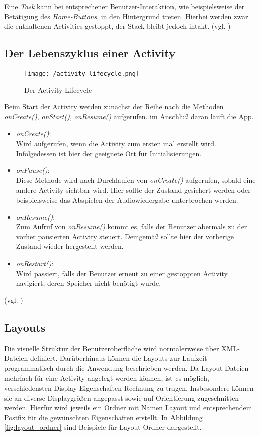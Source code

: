 Eine \emph{Task} kann bei entsprechener Benutzer-Interaktion, wie
beispielsweise der Betätigung des \emph{Home-Buttons}, in den Hintergrund treten.
Hierbei werden zwar die enthaltenen Activities gestoppt, der Stack bleibt jedoch intakt.
(vgl. \cite{ADevBackstack})
\subsection{Der Lebenszyklus einer Activity}

\begin{figure}[H]
\centering
\texttt{[image: /activity\_lifecycle.png]}
\caption{Der Activity Lifecycle \cite{ADevActivity}}
\label{fig:actlifecycle}
\end{figure}

Beim Start der Activity werden zunächst der Reihe nach die Methoden \emph{onCreate()},
\emph{onStart()}, \emph{onResume()} aufgerufen. im Anschluß daran läuft die App.

\begin{itemize}
   \item \emph{onCreate()}:\\
   Wird aufgerufen, wenn die Activity zum ersten mal erstellt wird. Infolgedessen ist hier
   der geeignete Ort für Initialisierungen.
   \item \emph{onPause()}:\\
   Diese Methode wird nach Durchlaufen von \emph{onCreate()} aufgerufen, sobald eine andere Activity
   sichtbar wird. Hier sollte der Zustand gesichert werden oder beispielsweise das Abspielen der
   Audiowiedergabe unterbrochen werden.
   \item \emph{onResume()}:\\
   Zum Aufruf von \emph{onResume()} kommt es, falls der Benutzer abermals zu der vorher pausierten
   Activity steuert. Demgemäß sollte hier der vorherige Zustand wieder hergestellt werden.
   \item \emph{onRestart()}:\\
   Wird passiert, falls der Benutzer erneut zu einer gestoppten Activity navigiert, deren
   Speicher nicht benötigt wurde.
\end{itemize}
(vgl. \cite{ADevActivity})   

\subsection{Layouts}
Die visuelle Struktur der Benutzeroberfläche wird normalerweise über XML-Dateien definiert.
Darüberhinaus können die Layouts zur Laufzeit programmatisch durch die Anwendung beschrieben
werden. Da Layout-Dateien mehrfach für eine Activity angelegt werden können, ist es möglich,
verschiedensten Display-Eigenschaften Rechnung zu tragen. Insbesondere können sie an
diverse Displaygrößen angepasst sowie auf Orientierung zugeschnitten werden. Hierfür wird jeweils
ein Ordner mit Namen Layout und entsprechendem Postfix für die gewünschten Eigenschaften erstellt.
In Abbildung \ref{fig:layout_ordner} sind Beispiele für Layout-Ordner dargestellt.

